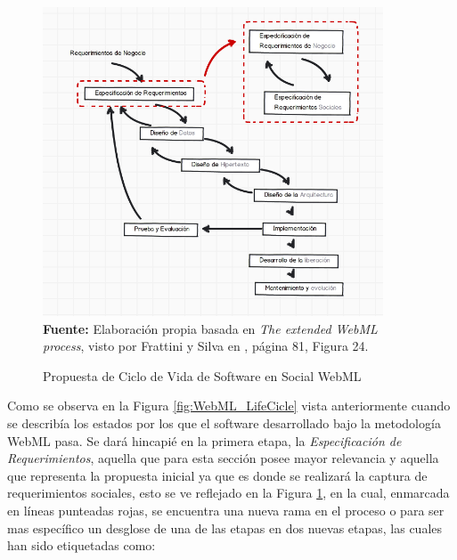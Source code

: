 \documentclass[oneside,12pt,a4paper]{memoir}%
\begin{document}
    
    \begin{figure}[here]
        \centering
    	\caption{Propuesta de Ciclo de Vida de Software en Social WebML}
    	\includegraphics[width=0.9\textwidth]{figure/fig_SocialWebMLLifeCicle.PNG}
		\newline
			\textbf{Fuente:} Elaboraci\'on propia basada en \textit{The extended WebML
			process}, visto por Frattini y Silva en \cite{Frattini2007}, p\'agina 81,
			Figura 24.
		\label{fig:SocialWebML_LifeCicle}
    \end{figure}
    
	Como se observa en la Figura \ref{fig:WebML_LifeCicle} vista anteriormente
	cuando se describ\'ia los estados por los que el software desarrollado bajo la
	metodolog\'ia \ac{WebML} pasa. Se dar\'a hincapi\'e en la primera etapa, la
	\textit{Especificaci\'on de Requerimientos}, aquella que para esta secci\'on
	posee mayor relevancia y aquella que representa la propuesta inicial ya que es
	donde se realizar\'a la captura de requerimientos sociales, esto se ve reflejado en la Figura
	\ref{fig:SocialWebML_LifeCicle}, en la cual, enmarcada en l\'ineas punteadas
	rojas, se encuentra una nueva rama en el proceso o para ser mas espec\'ifico un
	desglose de una de las etapas en dos nuevas etapas, las cuales han
	sido etiquetadas como:
\end{document}
